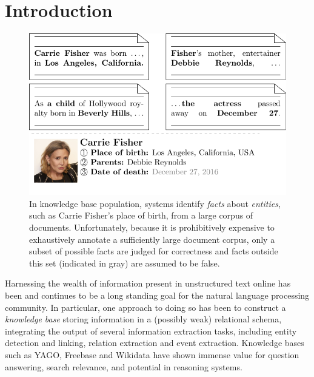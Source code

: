 \section{Introduction}
\label{sec:intro}

\begin{figure}
  \includegraphics[width=\columnwidth]{figures/task}
  \caption{\label{fig:task}
  In knowledge base population, systems identify \textit{facts} about \textit{entities}, such as Carrie Fisher's place of birth, from a large corpus of documents.
  Unfortunately, because it is prohibitively expensive to exhaustively annotate a sufficiently large document corpus,
  only a subset of possible facts are judged for correctness and 
  facts outside this set (indicated in gray) are assumed to be false.
  }
\end{figure}

Harnessing the wealth of information present in unstructured text online has been and continues to be a long standing goal for the natural language processing community.
In particular, one approach to doing so has been to construct a \textit{knowledge base} storing information in a (possibly weak) relational schema, integrating the output of several information extraction tasks, including entity detection and linking, relation extraction and event extraction.
Knowledge bases such as YAGO, Freebase and Wikidata have shown immense value for question answering, search relevance, and potential in reasoning systems\needcite.


